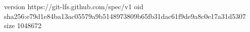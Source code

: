 version https://git-lfs.github.com/spec/v1
oid sha256:e79d1e84ba13ac05579a9b5148973809b65fb31dac61f9de9a8c0e17a31d5307
size 1048672
